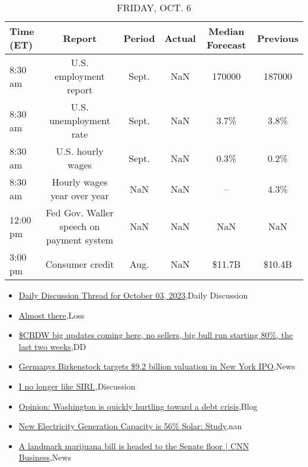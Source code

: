 \documentclass{article}%
\begin{document}
%


\begin{table}[htbp]%
\caption{FRIDAY, OCT. 6}%
\centering%
\begin{adjustbox}{width=1\textwidth}%
\begin{tabular}{lccccc}
\toprule
Time (ET) &                                   Report & Period & Actual & Median Forecast & Previous \\
\midrule
  8:30 am &                   U.S. employment report &  Sept. &    NaN &          170000 &   187000 \\
  8:30 am &                   U.S. unemployment rate &  Sept. &    NaN &            3.7\% &     3.8\% \\
  8:30 am &                        U.S. hourly wages &  Sept. &    NaN &            0.3\% &     0.2\% \\
  8:30 am &              Hourly wages year over year &    NaN &    NaN &              -- &     4.3\% \\
 12:00 pm & Fed Gov. Waller speech on payment system &    NaN &    NaN &             NaN &      NaN \\
  3:00 pm &                          Consumer credit &   Aug. &    NaN &          \$11.7B &   \$10.4B \\
\bottomrule
\end{tabular}
%
\end{adjustbox}%
\end{table}

%
\begin{itemize}%
\item%
\href{https://reddit.com/r/wallstreetbets/comments/16ynphy/daily\_discussion\_thread\_for\_october\_03\_2023/}{Daily Discussion Thread for October 03, 2023},Daily Discussion%
\item%
\href{https://reddit.com/r/wallstreetbets/comments/16ykmvh/almost\_there/}{Almost there},Loss%
\item%
\href{https://reddit.com/r/Baystreetbets/comments/16y4c3g/cbdw\_big\_updates\_coming\_here\_no\_sellers\_big\_bull/}{\$CBDW big updates coming here, no sellers, big bull run starting 80\%, the last two weeks},DD%
\item%
\href{https://reddit.com/r/StockMarket/comments/16y0mdf/germanys\_birkenstock\_targets\_92\_billion\_valuation/}{Germanys Birkenstock targets \$9.2 billion valuation in New York IPO},News%
\item%
\href{https://reddit.com/r/StockMarket/comments/16xg1j3/i\_no\_longer\_like\_siri/}{I no longer like SIRI.},Discussion%
\item%
\href{https://reddit.com/r/Economics/comments/16y8ecw/opinion\_washington\_is\_quickly\_hurtling\_toward\_a/}{Opinion: Washington is quickly hurtling toward a debt crisis},Blog%
\item%
\href{https://reddit.com/r/Economics/comments/16y5e3a/new\_electricity\_generation\_capacity\_is\_56\_solar/}{New Electricity Generation Capacity is 56\% Solar: Study},nan%
\item%
\href{https://reddit.com/r/Economics/comments/16y3mdy/a\_landmark\_marijuana\_bill\_is\_headed\_to\_the\_senate/}{A landmark marijuana bill is headed to the Senate floor | CNN Business},News%
\end{itemize}%
\end{document}
